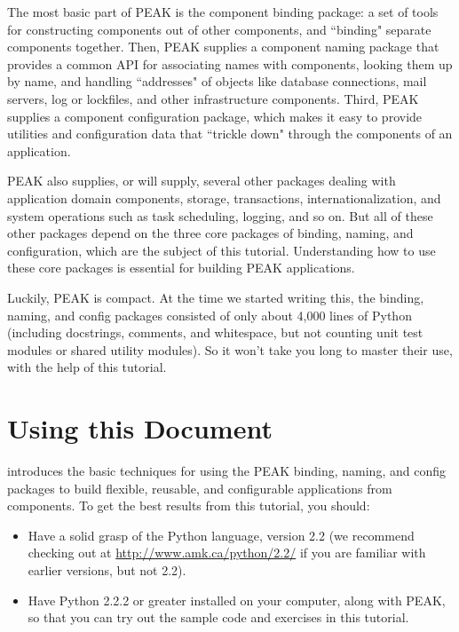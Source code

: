 The most basic part of PEAK is the component binding package: a set of
tools for constructing components out of other components, and ``binding"
separate components together. Then, PEAK supplies a component naming
package that provides a common API for associating names with
components, looking them up by name, and handling ``addresses" of objects
like database connections, mail servers, log or lockfiles, and other
infrastructure components. Third, PEAK supplies a component
configuration package, which makes it easy to provide utilities and
configuration data that ``trickle down" through the components of an
application.

PEAK also supplies, or will supply, several other packages dealing with
application domain components, storage, transactions,
internationalization, and system operations such as task scheduling,
logging, and so on. But all of these other packages depend on the three
core packages of binding, naming, and configuration, which are the
subject of this tutorial.  Understanding how to use these core packages
is essential for building PEAK applications.

Luckily, PEAK is compact. At the time we started writing this, the binding,
naming, and config packages consisted of only about 4,000 lines of Python
(including docstrings, comments, and whitespace, but not counting unit
test modules or shared utility modules). So it won't take you long to
master their use, with the help of this tutorial.

\newpage


\section{Using this Document}

 introduces
the basic techniques for using the PEAK binding, naming, and config
packages to build flexible, reusable, and configurable applications from
components. To get the best results from this tutorial, you should:

\begin{itemize}

\item Have a solid grasp of the Python language, version 2.2 (we
recommend checking out  at
\url{http://www.amk.ca/python/2.2/} if you are familiar with earlier
versions, but not 2.2).

\item Have Python 2.2.2 or greater installed on your computer, along
with PEAK, so that you can try out the sample code and exercises in this
tutorial.

\end{itemize}

